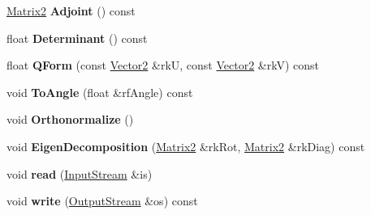 \begin{DoxyCompactItemize}
\item 
\hyperlink{class_i_dream_sky_1_1_matrix2}{Matrix2} {\bfseries Adjoint} () const \hypertarget{class_i_dream_sky_1_1_matrix2_a96f366b831f0377fcfb5523cbd50c37b}{}\label{class_i_dream_sky_1_1_matrix2_a96f366b831f0377fcfb5523cbd50c37b}

\item 
float {\bfseries Determinant} () const \hypertarget{class_i_dream_sky_1_1_matrix2_ad9f739c9248b6d2d426f259faedce391}{}\label{class_i_dream_sky_1_1_matrix2_ad9f739c9248b6d2d426f259faedce391}

\item 
float {\bfseries Q\+Form} (const \hyperlink{class_i_dream_sky_1_1_vector2}{Vector2} \&rkU, const \hyperlink{class_i_dream_sky_1_1_vector2}{Vector2} \&rkV) const \hypertarget{class_i_dream_sky_1_1_matrix2_a1a1bc832bd4196f9f7b4406149ca2929}{}\label{class_i_dream_sky_1_1_matrix2_a1a1bc832bd4196f9f7b4406149ca2929}

\item 
void {\bfseries To\+Angle} (float \&rf\+Angle) const \hypertarget{class_i_dream_sky_1_1_matrix2_aee37780c75356b8b63f817a99a7efcb1}{}\label{class_i_dream_sky_1_1_matrix2_aee37780c75356b8b63f817a99a7efcb1}

\item 
void {\bfseries Orthonormalize} ()\hypertarget{class_i_dream_sky_1_1_matrix2_af66b99445e88a06fab385e1a2edc0fc1}{}\label{class_i_dream_sky_1_1_matrix2_af66b99445e88a06fab385e1a2edc0fc1}

\item 
void {\bfseries Eigen\+Decomposition} (\hyperlink{class_i_dream_sky_1_1_matrix2}{Matrix2} \&rk\+Rot, \hyperlink{class_i_dream_sky_1_1_matrix2}{Matrix2} \&rk\+Diag) const \hypertarget{class_i_dream_sky_1_1_matrix2_a1f442053159034f2b1674cd407c3f47d}{}\label{class_i_dream_sky_1_1_matrix2_a1f442053159034f2b1674cd407c3f47d}

\item 
void {\bfseries read} (\hyperlink{class_i_dream_sky_1_1_input_stream}{Input\+Stream} \&is)\hypertarget{class_i_dream_sky_1_1_matrix2_acc73bd0814168ec02d6dd3b49ffda1b0}{}\label{class_i_dream_sky_1_1_matrix2_acc73bd0814168ec02d6dd3b49ffda1b0}

\item 
void {\bfseries write} (\hyperlink{class_i_dream_sky_1_1_output_stream}{Output\+Stream} \&os) const \hypertarget{class_i_dream_sky_1_1_matrix2_a0a069de9bc58a04faf02e83d1a516bd0}{}\label{class_i_dream_sky_1_1_matrix2_a0a069de9bc58a04faf02e83d1a516bd0}

\end{DoxyCompactItemize}
